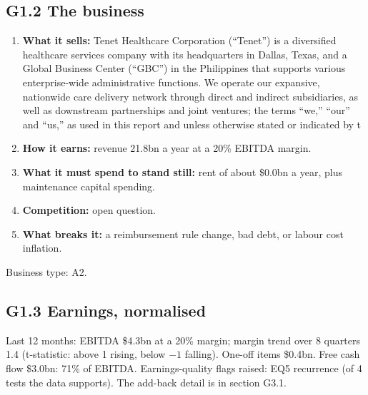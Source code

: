 \documentclass[11pt,a4paper]{article}
\begin{document}
\subsection*{G1.2 The business}
\begin{enumerate}
\item \textbf{What it sells:} Tenet Healthcare Corporation (“Tenet”) is a diversified healthcare services company with its headquarters in Dallas, Texas, and a Global Business Center (“GBC”) in the Philippines that supports various enterprise-wide administrative functions. We operate our expansive, nationwide care delivery network through direct and indirect subsidiaries, as well as downstream partnerships and joint ventures; the terms “we,” “our” and “us,” as used in this report and unless otherwise stated or indicated by t
\item \textbf{How it earns:} revenue 21.8bn a year at a 20\% EBITDA margin.
\item \textbf{What it must spend to stand still:} rent of about \$0.0bn a year, plus maintenance capital spending.
\item \textbf{Competition:} open question.
\item \textbf{What breaks it:} a reimbursement rule change, bad debt, or labour cost inflation.
\end{enumerate}
Business type: A2.
\subsection*{G1.3 Earnings, normalised}
Last 12 months: EBITDA \$4.3bn at a 20\% margin; margin trend over 8 quarters 1.4 (t-statistic: above 1 rising, below $-1$ falling). One-off items \$0.4bn. Free cash flow \$3.0bn: 71\% of EBITDA. Earnings-quality flags raised: EQ5 recurrence (of 4 tests the data supports). The add-back detail is in section G3.1.
\end{document}
